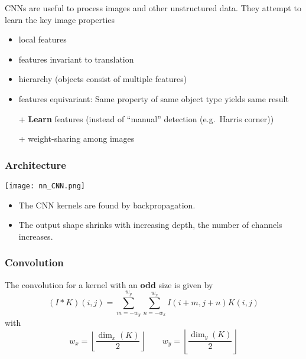 CNNs are useful to process images and other unstructured data. They attempt to learn the key image properties
\begin{itemize}
    \item local features
    \item features invariant to translation
    \item hierarchy (objects consist of multiple features)
    \item features equivariant: Same property of same object type yields same result
\end{itemize}

\newpar{}
\begin{itemize}
    \item [+] \textbf{Learn} features (instead of ``manual'' detection (e.g.\ Harris corner))
    \item [+] weight-sharing among images
\end{itemize}

\subsubsection{Architecture}
\begin{center}
    \texttt{[image: nn\_CNN.png]}
\end{center}
\newpar{}
\begin{itemize}
    \item The CNN kernels are found by backpropagation.
    \item The output shape shrinks with increasing depth, the number of channels increases.
\end{itemize}


\subsubsection{Convolution}
The convolution for a kernel with an \textbf{odd} size is given by
\begin{equation*}
    (I * K)(i,j) = \sum_{m=-w_y}^{w_y}\sum_{n=-w_x}^{w_x}I(i+m,j+n)K(i,j)
\end{equation*}
with
\begin{equation*}
    w_x = \left\lfloor \frac{\dim_x(K)}{2} \right\rfloor \qquad
    w_y = \left\lfloor \frac{\dim_y(K)}{2} \right\rfloor
\end{equation*}

